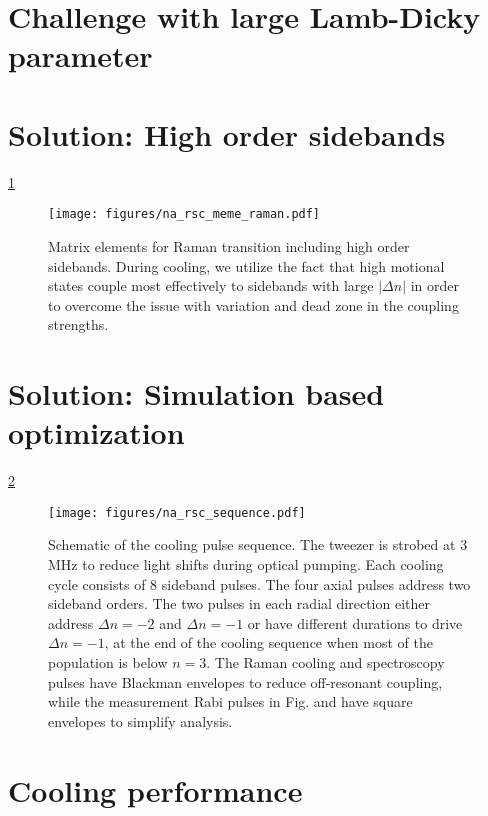 \section{Challenge with large Lamb-Dicky parameter}

\section{Solution: High order sidebands}

\ref{fig:na-rsc-meme-raman}

\begin{figure}
  \centering
  \texttt{[image: figures/na\_rsc\_meme\_raman.pdf]}
  \caption[Raman coupling including high order sidebands]{
    Matrix elements for Raman transition including high order sidebands.
    During cooling, we utilize the fact that high motional states couple most effectively
    to sidebands with large $|\Delta n|$ in order to overcome the issue with
    variation and dead zone in the coupling strengths.
    \label{fig:na-rsc-meme-raman}}
\end{figure}

\section{Solution: Simulation based optimization}

\ref{fig:na-rsc-sequence}

\begin{figure}
  \centering
  \texttt{[image: figures/na\_rsc\_sequence.pdf]}
  \caption[Simulation optimized Raman sideband cooling sequence for Sodium]{
    Schematic of the cooling pulse sequence. The tweezer is strobed at 3 MHz to
    reduce light shifts during optical pumping.
    Each cooling cycle consists of $8$ sideband pulses.
    The four axial pulses address two sideband orders.
    The two pulses in each radial direction either address $\Delta n=-2$ and $\Delta n=-1$
    or have different durations to drive $\Delta n=-1$,
    at the end of the cooling sequence when most of the population is below $n=3$.
    The Raman cooling and spectroscopy pulses have Blackman envelopes
    to reduce off-resonant coupling,
    while the measurement Rabi pulses in Fig.
    and 
    have square envelopes to simplify analysis.
    \label{fig:na-rsc-sequence}}
\end{figure}

\section{Cooling performance}
